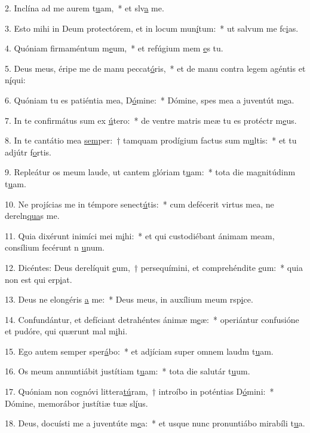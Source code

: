 2. Inclína ad me aurem t\uline{u}am,~* et slv\uline{a} me.\par 
3. Esto mihi in Deum protectórem, et in locum mun\uline{í}tum:~* ut salvum me fc\uline{i}as.\par 
4. Quóniam firmaméntum m\uline{e}um,~* et refúgium mem \uline{e}s tu.\par 
5. Deus meus, éripe me de manu peccat\uline{ó}ris,~* et de manu contra legem agéntis et n\uline{í}qui:\par 
6. Quóniam tu es patiéntia mea, D\uline{ó}mine:~* Dómine, spes mea a juventút m\uline{e}a.\par 
7. In te confirmátus sum ex \uline{ú}tero:~* de ventre matris meæ tu es protéctr m\uline{e}us.\par 
8. In te cantátio mea \uline{sem}per:~† tamquam prodígium factus sum m\uline{u}ltis:~* et tu adjútr f\uline{o}rtis.\par 
9. Repleátur os meum laude, ut cantem glóriam t\uline{u}am:~* tota die magnitúdinm t\uline{u}am.\par 
10. Ne projícias me in témpore senect\uline{ú}tis:~* cum defécerit virtus mea, ne dereln\uline{qua}s me.\par 
11. Quia dixérunt inimíci mei m\uline{i}hi:~* et qui custodiébant ánimam meam, consílium fecérunt n \uline{u}num.\par 
12. Dicéntes: Deus derelíquit \uline{e}um,~† persequímini, et comprehéndite \uline{e}um:~* quia non est qui erp\uline{i}at.\par 
13. Deus ne elongéris \uline{a} me:~* Deus meus, in auxílium meum rsp\uline{i}ce.\par 
14. Confundántur, et defíciant detrahéntes ánimæ m\uline{e}æ:~* operiántur confusióne et pudóre, qui quærunt mal m\uline{i}hi.\par 
15. Ego autem semper sper\uline{á}bo:~* et adjíciam super omnem laudm t\uline{u}am.\par 
16. Os meum annuntiábit justítiam t\uline{u}am:~* tota die salutár t\uline{u}um.\par 
17. Quóniam non cognóvi littera\uline{tú}ram,~† introíbo in poténtias D\uline{ó}mini:~* Dómine, memorábor justítiæ tuæ sl\uline{í}us.\par 
18. Deus, docuísti me a juventúte m\uline{e}a:~* et usque nunc pronuntiábo mirabíli t\uline{u}a.\par 
